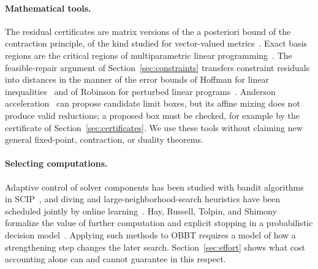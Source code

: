 \paragraph{Mathematical tools.} The residual certificates are matrix
versions of the a posteriori bound of the contraction principle, of the kind
studied for vector-valued metrics~\cite{jachymski2016perov}. Exact basis
regions are the critical regions of multiparametric linear
programming~\cite{borrelli2003parametric}. The feasible-repair argument of
Section~\ref{sec:constraints} transfers constraint residuals into distances
in the manner of the error bounds of Hoffman for linear
inequalities~\cite{hoffman1952-on-approximate-solutions-of-systems} and of
Robinson for perturbed linear programs~\cite{robinson1973-bounds-for-error-in-the-solution-set}.
Anderson acceleration~\cite{walker2011anderson} can propose candidate limit
boxes, but its affine mixing does not produce valid reductions; a proposed box
must be checked, for example by the certificate of
Section~\ref{sec:certificates}. We use these tools without claiming new
general fixed-point, contraction, or duality theorems.

\paragraph{Selecting computations.} Adaptive control of solver components
has been studied with bandit algorithms in SCIP~\cite{hendel2018adaptive},
and diving and large-neighborhood-search heuristics have been scheduled
jointly by online learning~\cite{chmiela2023scheduling}. Hay, Russell,
Tolpin, and Shimony formalize the value of further computation and explicit
stopping in a probabilistic decision model~\cite{hay2012computations}.
Applying such methods to OBBT requires a model of how a strengthening step
changes the later search. Section~\ref{sec:effort} shows what cost
accounting alone can and cannot guarantee in this respect.
